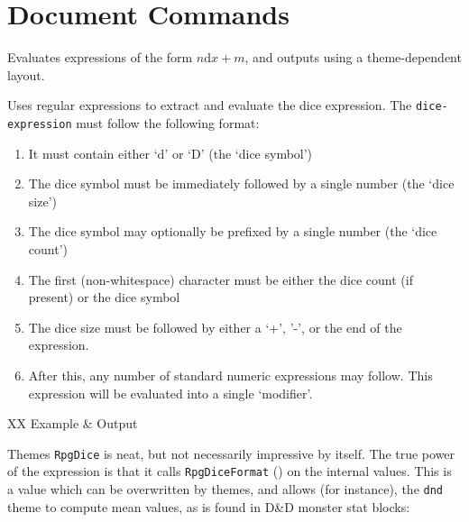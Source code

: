 	\section{Document Commands}

		\begin{macrolist}
				{\label{Macro:Dice}
					Evaluates expressions of the form $n\mathrm{d}x + m$, and outputs using a theme-dependent layout.
				}
				{
				}{
					Uses regular expressions to extract and evaluate the dice expression. The \verb|dice-expression| must follow the following format:
					\begin{enumerate}
						\item It must contain either `d' or `D' (the `dice symbol')
						\item The dice symbol must be immediately followed by a single number (the `dice size')
						\item The dice symbol may optionally be prefixed by a single number (the `dice count')
						\item The first (non-whitespace) character must be either the dice count (if present) or the dice symbol
						\item The dice size must be followed by either a `+', '-', or the end of the expression.
						\item After this, any number of standard numeric expressions may follow. This expression will be evaluated into a single `modifier'.
					\end{enumerate} 
					\begin{RpgTable}{XX}
						Example & Output \\
					\end{RpgTable}
					\newline\vspace{1em}
					{\RpgFontSubsubsection{} Themes}
					\newline
					\verb|RpgDice| is neat, but not necessarily impressive by itself. The true power of the expression is that it calls \verb|RpgDiceFormat| () on the internal values. This is a value which can be overwritten by themes, and allows (for instance), the \verb|dnd| theme to compute mean values, as is found in D\&D monster stat blocks:
					

}
\end{macrolist}
